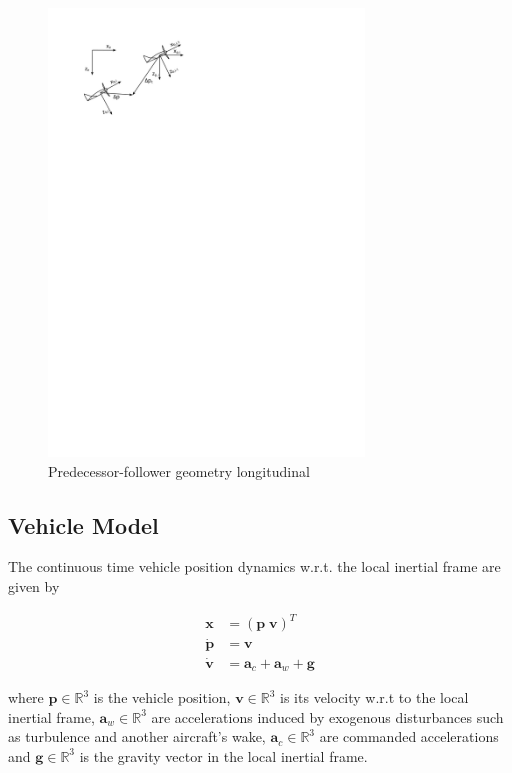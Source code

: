 \documentclass{ifacconf}
\providecommand{\mbf}[1]{\mathbf{#1}}
\begin{document}
\begin{figure}
\begin{center}
\includegraphics[width=8.4cm]{frames}    %
\caption{Predecessor-follower geometry longitudinal}
\label{fig:frames}
\end{center}
\end{figure}

\subsection{Vehicle Model}

The continuous time vehicle position dynamics w.r.t. the local inertial frame are given by

\begin{align}
\mathbf{x} &= (\mbf{p} \; \mbf{v})^T \\
\dot{\mathbf{p}} &= \mbf{v}\\
\dot{\mbf{v}} &= \mbf{a}_{c} + \mbf{a}_w + \mbf{g}
\end{align}

where $\mbf{p} \in \mathbb{R}^3$ is the vehicle position, $\mbf{v} \in \mathbb{R}^3$ is its velocity w.r.t to the local inertial frame, $\mbf{a}_w \in \mathbb{R}^3$ are accelerations induced by exogenous disturbances such as turbulence and another aircraft's wake, $\mbf{a}_{c} \in \mathbb{R}^3$ are commanded accelerations and $\mbf{g} \in \mathbb{R}^3$ is the gravity vector in the local inertial frame.
\end{document}
